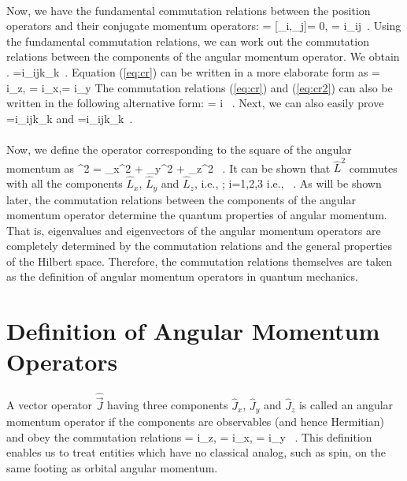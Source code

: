 \paragraph{}
Now, we have the fundamental	commutation relations between the position operators and their conjugate momentum operators:			
= [_i,_j]=	0, =	i\hbar \delta_{ij}\, .
\ee
Using the fundamental commutation relations, we can work out the commutation relations between the components of the angular
momentum operator. We obtain\, .
=i\hbar \epsilon_{ijk}_k\, .
\label{eq:cr}
\ee
Equation (\ref{eq:cr}) can be written in a more elaborate form as
 = i\hbar {}_z,  = i\hbar {}_x, = i\hbar {}_y
\label{eq:cr2}
\ee
The commutation relations (\ref{eq:cr}) and (\ref{eq:cr2}) can also be written in the following alternative form:
\be
{} \times {} = i \hbar {}\, .
\label{eq:cr3}
\ee
Next, we can also easily prove
=i\hbar\epsilon_{ijk}_k
\ee
and
=i\hbar\epsilon_{ijk}_k\, .
\ee


\paragraph{}
Now, we define the operator corresponding to the square of the angular momentum as
\be
{}^2 = _x^2 + _y^2 + _z^2 \, .
\ee
It can be shown that $\hat{L}^2$ commutes with all the components $\hat{L}_x$, $\hat{L}_y$ and $\hat{L}_z$, i.e.,
; \; i=1,2,3
\ee
i.e.,
 \, .
\ee
As will be shown later, the commutation relations between the components of the angular momentum operator determine the
quantum properties of angular momentum. That is, eigenvalues and eigenvectors of the angular momentum operators are completely determined by the commutation relations and the general properties of the Hilbert space. Therefore, the commutation relations themselves are
taken as the definition of angular momentum operators in quantum mechanics.



\section{Definition of Angular Momentum Operators}
A vector operator $\hat{\vec{J}}$ having three components $\hat{J}_x$, $\hat{J}_y$ and $\hat{J}_z$ is called an
angular momentum operator if the components are observables (and hence Hermitian) and obey the commutation relations
  =  i\hbar{}_z,   =  i\hbar{}_x,   =  i\hbar{}_y \, .
\label{eq:cr4}
\ee
This definition enables us to treat entities which have no classical analog, such as spin, on the same footing as
orbital angular momentum.

